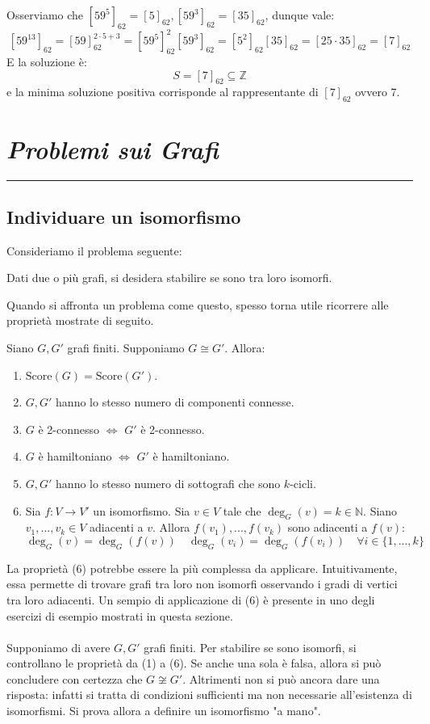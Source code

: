 \documentclass[oneside]{book}
\newcommand{\chptr}[1]{\chapter{\textit{#1}}\noindent\rule{\textwidth}{1pt}}
\theoremstyle{remark}
\begin{document}
\begin{tcolorbox}[enhanced, breakable, colback=blue!30, colframe=blue!30!black, title=Esempio]
Osserviamo che $[59^5]_{62}=[5]_{62}, [59^3]_{62}=[35]_{62}$, dunque
vale:
\[ [59^{13}]_{62}=[59]^{2\cdot5+3}_{62}=[59^5]^2_{62}[59^3]_{62}=[5^2]_{62}[35]_{62}=[25\cdot35]_{62}=[7]_{62} \]
E la soluzione è:
\[ S=[7]_{62}\subseteq\mathbb{Z} \]
e la minima soluzione positiva corrisponde al rappresentante di $[7]_{62}$
ovvero 7.
\end{tcolorbox}








\chptr{Problemi sui Grafi}


\section{Individuare un isomorfismo}
Consideriamo il problema seguente:
\begin{center}
Dati due o più grafi, si desidera stabilire se sono tra loro isomorfi.
\end{center}
Quando si affronta un problema come questo, spesso torna utile ricorrere
alle proprietà mostrate di seguito.
\begin{tcolorbox}[colback=red!30, colframe=red!30!black, title=Alcune caratteristiche dei grafi isomorfi]
Siano $G,G'$ grafi finiti. Supponiamo $G\cong G'$. Allora:
\begin{enumerate}
\item $\text{Score}(G)=\text{Score}(G')$.
\item $G,G'$ hanno lo stesso numero di componenti connesse.
\item $G$ è 2-connesso $\Longleftrightarrow$ $G'$ è 2-connesso.
\item $G$ è hamiltoniano $\Longleftrightarrow$ $G'$ è hamiltoniano.
\item $G,G'$ hanno lo stesso numero di sottografi che sono $k$-cicli.
\item Sia $f:V\to V'$ un isomorfismo. Sia $v\in V$ tale che $\deg_G(v)=k\in\mathbb{N}$.
Siano $v_1,...,v_k \in V$ adiacenti a $v$. Allora $f(v_1),...,f(v_k)$ sono
adiacenti a $f(v)$: \[\deg_G(v)=\deg_G(f(v)) \quad \deg_G(v_i)=\deg_G(f(v_i)) \quad \forall i \in\{1,...,k\}\]
\end{enumerate}
\end{tcolorbox}

La proprietà (6) potrebbe essere la più complessa da applicare. Intuitivamente,
essa permette di trovare grafi tra loro non isomorfi osservando i gradi
di vertici tra loro adiacenti. Un sempio di applicazione di (6) è presente
in uno degli esercizi di esempio mostrati in questa sezione.
\\\\
Supponiamo di avere $G,G'$ grafi finiti. Per stabilire se sono isomorfi, si
controllano le proprietà da (1) a (6). Se anche una sola è falsa, allora
si può concludere con certezza che $G\not\cong G'$. Altrimenti non si può
ancora dare una risposta: infatti si tratta di condizioni sufficienti ma
non necessarie all'esistenza di isomorfismi. Si prova allora a definire un
isomorfismo "a mano".
\end{document}
